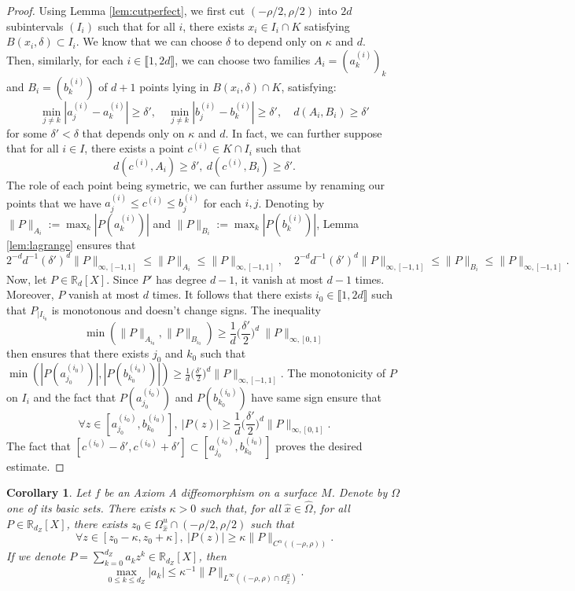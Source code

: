 \documentclass[a4paper]{article}
\newtheorem{corollary}[theorem]{Corollary}
\theoremstyle{definition}
\begin{document}
\begin{proof}
Using Lemma \ref{lem:cutperfect}, we first cut $(-\rho/2,\rho/2)$ into $2d$ subintervals $(I_i)$ such that for all $i$, there exists $x_i \in I_i \cap K$ satisfying $B(x_i,\delta) \subset I_i$. We know that we can choose $\delta$ to depend only on $\kappa$ and $d$.\\

Then, similarly, for each $i \in \llbracket 1, 2d \rrbracket$, we can choose two families $A_i = (a_k^{(i)})_k$ and $B_i = (b_k^{(i)})$ of $d+1$ points lying in $B(x_i,\delta) \cap K$, satisfying:
$$ \min_{j \neq k} |a_j^{(i)} - a_k^{(i)}| \geq \delta' ,\quad \min_{j \neq k} |b_j^{(i)} - b_k^{(i)}| \geq \delta' ,\quad d(A_i,B_i) \geq \delta'  $$
for some $\delta' < \delta$ that depends only on $\kappa$ and $d$. In fact, we can further suppose that for all $i \in I$, there exists a point $c^{(i)} \in K \cap I_i$ such that $$d(c^{(i)},A_i) \geq \delta' , \ d(c^{(i)},B_i) \geq \delta'.$$
The role of each point being symetric, we can further assume by renaming our points that we have $a_j^{(i)} \leq c^{(i)} \leq b_j^{(i)}$ for each $i,j$. Denoting by $\|P\|_{A_i} := \max_k |P(a^{(i)}_k)|$ and $\|P\|_{B_i} := \max_k |P(b^{(i)}_k)|$, Lemma \ref{lem:lagrange} ensures that
$$2^{-d} d^{-1} (\delta')^d \|P\|_{\infty,[-1,1]} \leq \|P\|_{A_i} \leq \|P\|_{\infty,[-1,1]} ,\quad 2^{-d} d^{-1} (\delta')^d \|P\|_{\infty,[-1,1]} \leq \|P\|_{B_i} \leq \|P\|_{\infty,[-1,1]} .$$
Now, let $P \in \mathbb{R}_d[X]$. Since $P'$ has degree $d-1$, it vanish at most $d-1$ times. Moreover, $P$ vanish at most $d$ times. It follows that there exists $i_{0} \in \llbracket 1,2d \rrbracket$ such that $P_{|I_{i_0}}$ is monotonous and doesn't change signs. The inequality
$$ \min( \|P\|_{A_{i_0}}, \|P\|_{B_{i_0}} )\geq \frac{1}{d} \Big(\frac{\delta'}{2}\Big)^d \ \|P\|_{\infty,[0,1]}$$
then ensures that there exists $j_0$ and $k_0$ such that
$ \min (|P(a_{j_0}^{(i_0)})|, |P(b_{k_0}^{(i_0)})| ) \geq \frac{1}{d} \big(\frac{\delta'}{2}\big)^d \|P\|_{\infty,[-1,1]} $.
The monotonicity of $P$ on $I_i$ and the fact that $P(a_{j_0}^{(i_0)})$ and $P(b_{k_0}^{(i_0)})$ have same sign ensure that
$$ \forall z \in [a_{j_0}^{(i_0)},b_{k_0}^{(i_0)}], \ |P(z)| \geq \frac{1}{d} \Big(\frac{\delta'}{2}\Big)^d \|P\|_{\infty,[0,1]} . $$
The fact that $[c^{(i_0)} - \delta',c^{(i_0)} + \delta'] \subset [a_{j_0}^{(i_0)},b_{k_0}^{(i_0)}]$ proves the desired estimate.
\end{proof}

\begin{corollary}
Let $f$ be an Axiom A diffeomorphism on a surface $M$. Denote by $\Omega$ one of its basic sets. There exists $\kappa>0$ such that, for all ${\widehat{x}} \in \widehat{\Omega}$, for all $P \in \mathbb{R}_{d_Z}[X]$, there exists $z_0 \in \Omega_{\widehat{x}}^u \cap (-\rho/2,\rho/2)$ such that
$$ \forall z \in [z_0 - \kappa, z_0 + \kappa], \ |P(z)| \geq \kappa \|P\|_{C^\alpha((-\rho,\rho))}. $$
If we denote $P = \sum_{k=0}^{d_Z} a_k z^k \in \mathbb{R}_{d_Z}[X]$, then
$$\max_{0 \leq k \leq d_Z} |a_k| \leq \kappa^{-1} \|P\|_{L^\infty( (-\rho,\rho) \cap \Omega_{\widehat{x}}^u )}. $$
\end{corollary}
\end{document}
